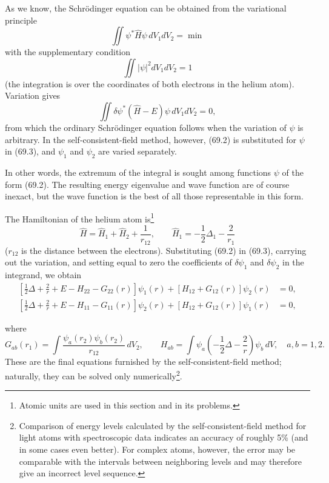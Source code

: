 As we know, the Schrödinger equation can be obtained from the variational principle
\[
 \iint\psi^*\hat H\psi\,dV_1dV_2=\min
\]
with the supplementary condition
\[
 \iint|\psi|^2dV_1dV_2=1
\]
(the integration is over the coordinates of both electrons in the helium atom). Variation gives
\begin{equation}
 \iint\delta\psi^*(\hat H-E)\psi\,dV_1dV_2=0,
 \tag{69.3}
\end{equation}
from which the ordinary Schrödinger equation follows when the variation of $\psi$ is arbitrary. In the self-consistent-field method, however, (69.2) is substituted for $\psi$ in (69.3), and $\psi_1$ and $\psi_2$ are varied separately.

In other words, the extremum of the integral is sought among functions $\psi$ of the form (69.2). The resulting energy eigenvalue and wave function are of course inexact, but the wave function is the best of all those representable in this form.

The Hamiltonian of the helium atom is\footnote{Atomic units are used in this section and in its problems.}
\begin{equation}
 \hat H=\hat H_1+\hat H_2+\frac1{r_{12}},\qquad \hat H_1=-\frac12\Delta_1-\frac2{r_1}
 \tag{69.4}
\end{equation}
($r_{12}$ is the distance between the electrons). Substituting (69.2) in (69.3), carrying out the variation, and setting equal to zero the coefficients of $\delta\psi_1$ and $\delta\psi_2$ in the integrand, we obtain
\begin{equation}
\begin{split}
 [\tfrac12\Delta+\tfrac2r+E-H_{22}-G_{22}(r)]\psi_1(r)+[H_{12}+G_{12}(r)]\psi_2(r)&=0,\\
 [\tfrac12\Delta+\tfrac2r+E-H_{11}-G_{11}(r)]\psi_2(r)+[H_{12}+G_{12}(r)]\psi_1(r)&=0,
\end{split}\tag{69.5}
\end{equation}

where
\begin{equation}
 G_{ab}(r_1)=\int\frac{\psi_a(r_2)\psi_b(r_2)}{r_{12}}\,dV_2,\qquad
 H_{ab}=\int\psi_a\left(-\frac12\Delta-\frac2r\right)\psi_b\,dV,\quad a,b=1,2.
 \tag{69.6}
\end{equation}
These are the final equations furnished by the self-consistent-field method; naturally, they can be solved only numerically\footnote{Comparison of energy levels calculated by the self-consistent-field method for light atoms with spectroscopic data indicates an accuracy of roughly 5\% (and in some cases even better). For complex atoms, however, the error may be comparable with the intervals between neighboring levels and may therefore give an incorrect level sequence.}.

